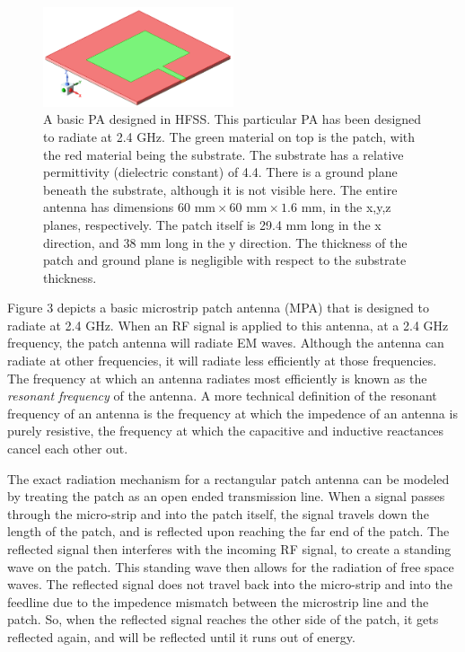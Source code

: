 \documentclass[12pt]{article}
\begin{document}
\begin{figure}[h]
    \centering
    \includegraphics[width=0.5\textwidth]{2.4GHz-basic-pa.png}
    \caption{A basic PA designed in HFSS. This particular PA has been designed to radiate at 2.4 GHz. The green material on top is the patch, with the red material being the substrate. The substrate has a relative permittivity (dielectric constant) of 4.4. There is a ground plane beneath the substrate, although it is not visible here. The entire antenna has dimensions $60 \text{ mm} \times 60 \text{ mm} \times 1.6 \text{ mm}$, in the x,y,z planes, respectively. The patch itself is 29.4 mm long in the x direction, and 38 mm long in the y direction. The thickness of the patch and ground plane is negligible with respect to the substrate thickness. }
\end{figure}

Figure 3 depicts a basic microstrip patch antenna (MPA) that is designed to radiate at 2.4 GHz. When an RF signal is applied to this antenna, at a 2.4 GHz frequency, the patch antenna will radiate EM waves. Although the antenna can radiate at other frequencies, it will radiate less efficiently at those frequencies. The frequency at which an antenna radiates most efficiently is known as the \textit{resonant frequency} of the antenna. A more technical definition of the resonant frequency of an antenna is the frequency at which the impedence of an antenna is purely resistive, the frequency at which the capacitive and inductive reactances cancel each other out. 

The exact radiation mechanism for a rectangular patch antenna can be modeled by treating the patch as an open ended transmission line. When a signal passes through the micro-strip and into the patch itself, the signal travels down the length of the patch, and is reflected upon reaching the far end of the patch. The reflected signal then interferes with the incoming RF signal, to create a standing wave on the patch. This standing wave then allows for the radiation of free space waves. The reflected signal does not travel back into the micro-strip and into the feedline due to the impedence mismatch between the microstrip line and the patch. So, when the reflected signal reaches the other side of the patch, it gets reflected again, and will be reflected until it runs out of energy.   
\end{document}
